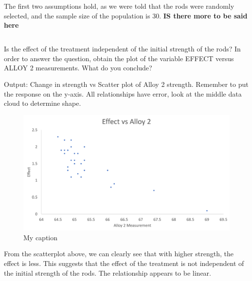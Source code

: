 \documentclass[letterpaper]{article}
\begin{document}
The first two assumptions hold, as we were told that the
rods were randomly selected, and the sample size of the population is 30.
\textbf{IS there more to be said here}

\subsection{}%
Is the effect of the treatment independent of the initial strength of the rods?
In order to answer the  question, obtain the plot of the variable EFFECT versus
ALLOY 2 measurements. What do you  conclude?

Output: Change in strength vs Scatter plot of Alloy 2 strength.
Remember to put the response on the y-axis. All relationships have
error, look at the middle data cloud to determine shape.

\begin{figure}[H]
 \centering
 \includegraphics[width=\textwidth]{q6.png}
 \caption{My caption}
 \label{q6}
\end{figure}

From the scatterplot above, we can clearly see that with higher strength, the effect
is less. This suggests that the effect of the treatment is not independent of the initial strength of the rods. The relationship appears to be linear.
\end{document}
